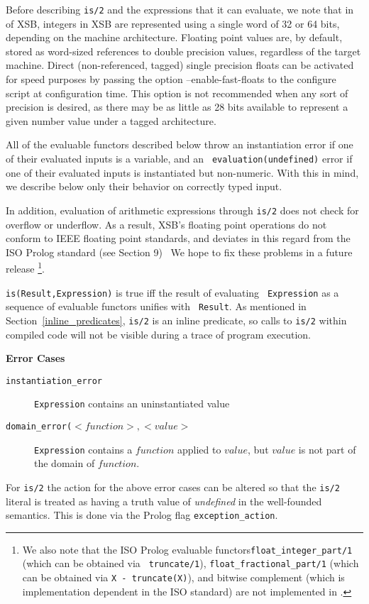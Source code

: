 Before describing {\tt is/2} and the expressions that it can evaluate,
we note that in \version{} of XSB, integers in XSB are represented
using a single word of 32 or 64 bits, depending on the machine
architecture. Floating point values are, by default, stored as
word-sized references to double precision values, regardless of the
target machine. Direct (non-referenced, tagged) single precision
floats can be activated for speed purposes by passing the option
--enable-fast-floats to the configure script at configuration time.
This option is not recommended when any sort of precision is desired,
as there may be as little as 28 bits available to represent a given
number value under a tagged architecture.  

All of the evaluable functors described below throw an instantiation
error if one of their evaluated inputs is a variable, and an {\tt
  evaluation(undefined)} error if one of their evaluated inputs is
instantiated but non-numeric.  With this in mind, we describe below
only their behavior on correctly typed input.

\compatibility
In addition, evaluation of arithmetic expressions through {\tt is/2}
does not check for overflow or underflow.  As a result, XSB's floating
point operations do not conform to IEEE floating point standards, and
deviates in this regard from the ISO Prolog standard (see
\cite{ISO-Prolog} Section 9)~ We hope to fix these problems in a
future release \footnote{We also note that the ISO Prolog evaluable
  functors{\tt float\_integer\_part/1} (which can be obtained via {\tt
    truncate/1}), {\tt float\_fractional\_part/1} (which can be
  obtained via {\tt X - truncate(X)}), and bitwise complement (which
  is implementation dependent in the ISO standard) are not implemented
  in \version .}.

\begin{description}
{\tt is(Result,Expression)} is true iff the result of evaluating {\tt
Expression} as a sequence of evaluable functors unifies with {\tt
Result}.  As mentioned in Section~\ref{inline_predicates}, {\tt is/2}
is an inline predicate, so calls to {\tt is/2} within compiled code
will not be visible during a trace of program execution.

{\bf Error Cases}
    \begin{description}
    \item[{\tt instantiation\_error}]
	{\tt Expression} contains an uninstantiated value
    \item[{\tt domain\_error($<function>,<value>$}] {\tt Expression}
      contains a $function$ applied to $value$, but $value$ is not
      part of the domain of $function$.
    \end{description}

For {\tt is/2} the action for the above error cases can be altered so
that the {\tt is/2} literal is treated as having a truth value of {\em
  undefined} in the well-founded semantics.  This is done via the
Prolog flag {\tt exception\_action}.

\end{description}

